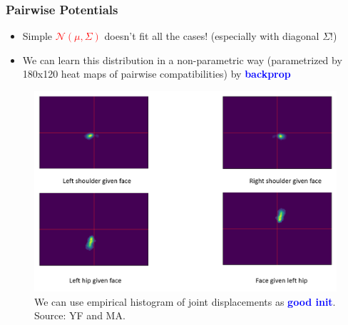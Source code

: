 \documentclass{beamer}
\newcommand\red[1]{\textcolor{red}{\textbf{#1}}}
\newcommand\blue[1]{\textcolor{blue}{\textbf{#1}}}
\begin{document}
    \begin{frame}[t]
    	\frametitle{Pairwise Potentials}
    	\begin{itemize}
    		\item Simple \red{$\mathcal{N}(\mu, \Sigma)$} doesn’t fit all the cases! (especially with diagonal $\Sigma$!) \\
    		\item We can learn this distribution in a non-parametric way (parametrized by 180x120 heat maps of pairwise compatibilities) by \blue{backprop}
    	\end{itemize}
    	\begin{center}
    		\begin{figure}[htbp] %
    			\includegraphics[scale=0.28]{pairwise_po.png} \\
    			\scriptsize We can use empirical histogram of joint displacements as \blue{good init}. Source: YF and MA.
    		\end{figure}
    	\end{center}
    \end{frame}
\end{document}
